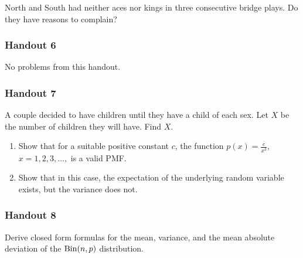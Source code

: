 \begin{problem}[Handout 5, \# 14]
  North and South had neither aces nor kings in three consecutive bridge
  plays. Do they have reasons to complain?
\end{problem}
\begin{solution*}
\end{solution*}

\subsubsection{Handout 6}
No problems from this handout.

\subsubsection{Handout 7}
\begin{problem}[Handout 7, \# 5]
  A couple decided to have children until they have a child of each
  sex. Let \(X\) be the number of children they will have. Find \(X\).
\end{problem}
\begin{solution*}
\end{solution*}

\begin{problem}[Handout 7, \# 8]
  \begin{enumerate}[label=(\alph*),noitemsep]
  \item Show that for a suitable positive constant \(c\), the function
    \(p(x)=\frac{c}{x^3}\), \(x=1,2,3,\dotsc,\) is a valid PMF.
  \item Show that in this case, the expectation of the underlying random
    variable exists, but the variance does not.
  \end{enumerate}
\end{problem}
\begin{solution*}
\end{solution*}

\subsubsection{Handout 8}
\begin{problem}[Handout 8, \# 4]
  Derive closed form formulas for the mean, variance, and the mean absolute
  deviation of the \(\operatorname{Bin}(n,p)\) distribution.
\end{problem}
\begin{solution*}
\end{solution*}

